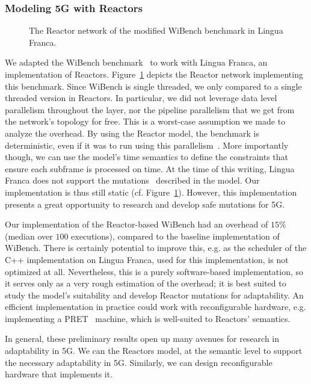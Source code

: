 \subsubsection{Modeling 5G with Reactors}

\begin{figure}[t]
	\centering
	\resizebox{1\textwidth}{!}{}
	\caption{The Reactor network of the modified WiBench benchmark in Lingua Franca.}
	\label{fig:reactors_wibench}
\end{figure}


We adapted the WiBench benchmark~\cite{wibench} to work with Lingua Franca, an implementation of Reactors. 
Figure~\ref{fig:reactors_wibench} depicts the Reactor network implementing this benchmark. 
Since WiBench is single threaded, we only compared to a single threaded version in Reactors.
In particular, we did not leverage data level parallelism throughout the layer, nor the pipeline parallelism that we get from the network's topology for free.
This is a worst-case assumption we made to analyze the overhead.
By using the Reactor model, the benchmark is deterministic, even if it was to run using this parallelism~\cite{lohstroh_cyphy19}.
More importantly though, we can use the model's time semantics to define the constraints that ensure each subframe is processed on time.
At the time of this writing, Lingua Franca does not support the mutations~\cite{lohstroh_cyphy19} described in the model.
Our implementation is thus still static (cf. Figure~\ref{fig:reactors_wibench}).
However, this implementation presents a great opportunity to research and develop safe mutations for 5G.

Our implementation of the Reactor-based WiBench had an overhead of $15\%$ (median over $100$ executions), compared to the baseline implementation of WiBench.
There is certainly potential to improve this, e.g. as the scheduler of the C++ implementation on Lingua Franca, used for this implementation, is not optimized at all.
Nevertheless, this is a purely software-based implementation, so it serves only as a very rough estimation of the overhead; it is best suited to study the model's suitability and develop Reactor mutations for adaptability.
An efficient implementation in practice could work with reconfigurable hardware, e.g. implementing a \ac{PRET}~\cite{pret} machine, which is well-suited to Reactors' semantics.

In general, these preliminary results open up many avenues for research in adaptability in 5G. We can the Reactors model, at the semantic level to support the necessary adaptability in 5G. Similarly, we can design reconfigurable hardware that implements it.

